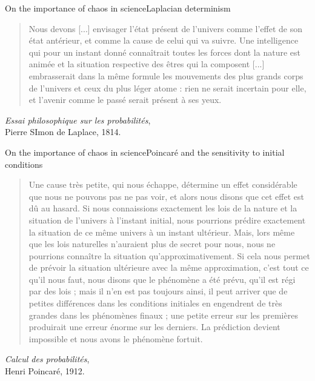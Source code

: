 \documentclass[usenames,dvipsnames,svgnames,10pt,aspectratio=169]{beamer}
\begin{document}
\begin{frame}[t, c]{On the importance of chaos in science}{Laplacian determinism}
	\begin{quote}
		Nous devons [...] envisager l'état présent de l'univers comme l'effet de son état antérieur, et comme la cause de celui qui va suivre. Une intelligence qui pour un instant donné connaîtrait toutes les forces dont la nature est animée et la situation respective des êtres qui la composent [...] embrasserait dans la même formule les mouvements des plus grands corps de l'univers et ceux du plus léger atome : rien ne serait incertain pour elle, et l'avenir comme le passé serait présent à ses yeux.
	\end{quote}

	\begin{flushright}
		\emph{Essai philosophique sur les probabilités}, \\ Pierre SImon de Laplace, 1814.
	\end{flushright}
\end{frame}

\begin{frame}[t, c]{On the importance of chaos in science}{Poincaré and the sensitivity to initial conditions}
	\begin{quote}
		Une cause très petite, qui nous échappe, détermine un effet considérable que nous ne pouvons pas ne pas voir, et alors nous disons que cet effet est dû au hasard. Si nous connaissions exactement les lois de la nature et la situation de l'univers à l'instant initial, nous pourrions prédire exactement la situation de ce même univers à un instant ultérieur. Mais, lors même que les lois naturelles n'auraient plus de secret pour nous, nous ne pourrions connaître la situation qu'approximativement. Si cela nous permet de prévoir la situation ultérieure avec la même approximation, c'est tout ce qu'il nous faut, nous disons que le phénomène a été prévu, qu'il est régi par des lois ; mais il n'en est pas toujours ainsi, il peut arriver que de petites différences dans les conditions initiales en engendrent de très grandes dans les phénomènes finaux ; une petite erreur sur les premières produirait une erreur énorme sur les derniers. La prédiction devient impossible et nous avons le phénomène fortuit.
	\end{quote}

	\begin{flushright}
		\emph{Calcul des probabilités},\\ Henri Poincaré, 1912.
	\end{flushright}

	\vspace{1cm}
\end{frame}
\end{document}
